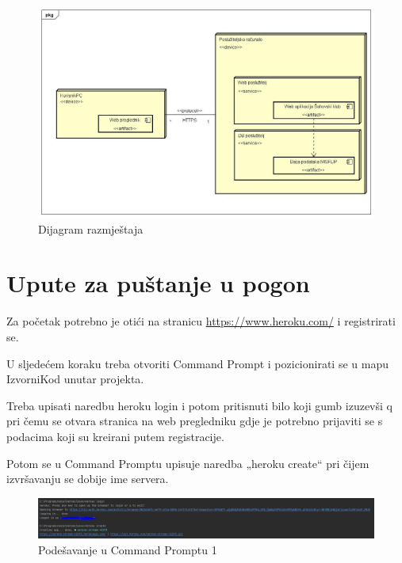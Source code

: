 			\begin{figure}[H]
				\centerfloat
				\includegraphics[scale=0.40]{dijagrami/Dijagramrazmjestaja.jpg} %
				\caption{Dijagram razmještaja}
				
			\end{figure}
			
			\eject
		
		\section{Upute za puštanje u pogon}
		
			\noindent Za početak potrebno je otići na stranicu \url{https://www.heroku.com/} i registrirati se. 
			
			\noindent U sljedećem koraku treba otvoriti Command Prompt i pozicionirati se u mapu IzvorniKod unutar projekta.
			
			\noindent Treba upisati naredbu heroku login i potom pritisnuti bilo koji gumb izuzevši q pri čemu se otvara stranica na web pregledniku gdje je potrebno prijaviti se s podacima koji su kreirani putem registracije.
			
			\noindent Potom se u Command Promptu upisuje naredba „heroku create“ pri čijem izvršavanju se dobije ime servera.
			
			\begin{figure}[H]
				\centerfloat
				\includegraphics[scale=0.3]{slike/pustanjeupogon1.jpeg} %
				\caption{Podešavanje u Command Promptu 1}
				
			\end{figure}
			
